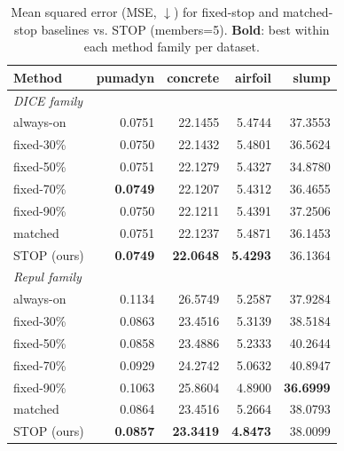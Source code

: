 \documentclass[sigconf]{acmart}
\begin{document}
\begin{table}[ht]
\centering
\caption{Mean squared error (MSE, $\downarrow$) for fixed-stop and matched-stop baselines vs. STOP (members=5). \textbf{Bold}: best within each method family per dataset.}
\label{tab:baselines_mse}
\small
\begin{tabular}{lrrrr}
\toprule
\textbf{Method} & \textbf{pumadyn} & \textbf{concrete} & \textbf{airfoil} & \textbf{slump} \\
\midrule
\multicolumn{5}{l}{\textit{DICE family}} \\
always-on   & 0.0751 & 22.1455 & 5.4744 & 37.3553 \\
fixed-30\%  & 0.0750 & 22.1432 & 5.4801 & 36.5624 \\
fixed-50\%  & 0.0751 & 22.1279 & 5.4327 & 34.8780 \\
fixed-70\%  & \textbf{0.0749} & 22.1207 & 5.4312 & 36.4655 \\
fixed-90\%  & 0.0750 & 22.1211 & 5.4391 & 37.2506 \\
matched     & 0.0751 & 22.1237 & 5.4871 & 36.1453 \\
STOP (ours) & \textbf{0.0749} & \textbf{22.0648} & \textbf{5.4293} & 36.1364 \\
\midrule
\multicolumn{5}{l}{\textit{Repul family}} \\
always-on   & 0.1134 & 26.5749 & 5.2587 & 37.9284 \\
fixed-30\%  & 0.0863 & 23.4516 & 5.3139 & 38.5184 \\
fixed-50\%  & 0.0858 & 23.4886 & 5.2333 & 40.2644 \\
fixed-70\%  & 0.0929 & 24.2742 & 5.0632 & 40.8947 \\
fixed-90\%  & 0.1063 & 25.8604 & 4.8900 & \textbf{36.6999} \\
matched     & 0.0864 & 23.4516 & 5.2664 & 38.0793 \\
STOP (ours) & \textbf{0.0857} & \textbf{23.3419} & \textbf{4.8473} & 38.0099 \\
\bottomrule
\end{tabular}
\end{table}
\end{document}
